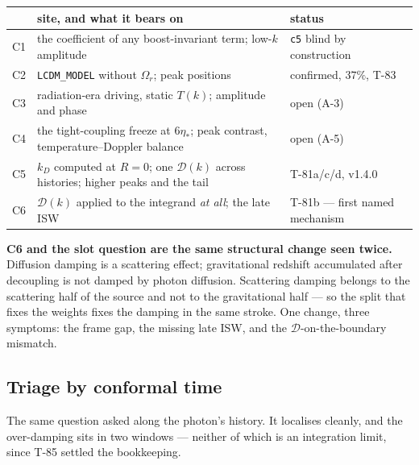 \begin{center}\small
\begin{tabularx}{\textwidth}{@{}l >{\raggedright\arraybackslash}X l@{}}
\toprule
 & \textbf{site, and what it bears on} & \textbf{status} \\
\midrule
C1 & the coefficient of any boost-invariant term; low-$k$ amplitude &
  \texttt{c5} blind by construction \\
C2 & \texttt{LCDM\_MODEL} without $\Omega_r$; peak positions &
  confirmed, $37\%$, T-83 \\
C3 & radiation-era driving, static $T(k)$; amplitude and phase & open (A-3) \\
C4 & the tight-coupling freeze at $6\eta_*$; peak contrast, temperature--Doppler
  balance & open (A-5) \\
C5 & $k_D$ computed at $R=0$; one $\mathcal D(k)$ across histories; higher
  peaks and the tail & T-81a/c/d, v1.4.0 \\
C6 & $\mathcal D(k)$ applied to the integrand \emph{at all}; the late ISW &
  T-81b --- first named mechanism \\
\bottomrule
\end{tabularx}
\end{center}

\noindent
\textbf{C6 and the slot question are the same structural change seen twice.}
Diffusion damping is a scattering effect; gravitational redshift accumulated
after decoupling is not damped by photon diffusion. Scattering damping belongs
to the scattering half of the source and not to the gravitational half --- so
the split that fixes the weights fixes the damping in the same stroke. One
change, three symptoms: the frame gap, the missing late ISW, and the
$\mathcal D$-on-the-boundary mismatch.

\subsection{Triage by conformal time}
The same question asked along the photon's history. It localises cleanly, and
the over-damping sits in two windows --- neither of which is an integration
limit, since T-85 settled the bookkeeping.


